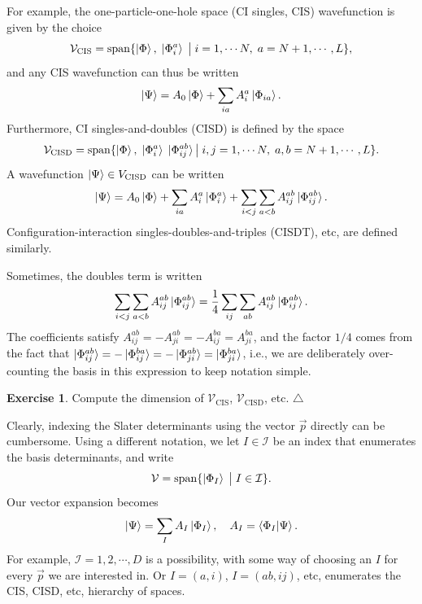 \documentclass{report}
\theoremstyle{plain}
\theoremstyle{definition}
\newtheorem{exerc}{Exercise}[chapter]
\newcommand\xqed[1]{%
  \leavevmode\unskip\penalty9999 \hbox{}\nobreak\hfill
  \quad\hbox{#1}}
\newcommand\demo{\xqed{$\triangle$}}
\newenvironment{exercise}{\bigskip\begin{exerc}}{\demo\end{exerc}\bigskip}
\begin{document}
For example, the one-particle-one-hole space (CI singles, CIS)
wavefunction is given by the choice
\begin{equation}
  \mathcal{V}_\text{CIS} = \operatorname{span} \{ \ket{\Phi}, \; \ket{\Phi_i^a} \; \big| \;
  i = 1,\cdots N, \; a = N+1,\cdots, L \},
\end{equation}
and any CIS wavefunction can thus be written
\begin{equation}
  \ket{\Psi} = A_0 \ket{\Phi} + \sum_{ia} A_{i}^{a} \ket{\Phi_{ia}}.
\end{equation}
Furthermore, CI singles-and-doubles (CISD) is defined by the space
\begin{equation}
  \mathcal{V}_\text{CISD} = \operatorname{span} \{ \ket{\Phi}, \; \ket{\Phi_i^a}
  \; \ket{\Phi_{ij}^{ab}} \big| \;
  i,j = 1,\cdots N, \; a,b = N+1,\cdots, L \}.
\end{equation}
A wavefunction $\ket{\Psi} \in V_\text{CISD}$ can be written
\begin{equation}
  \ket{\Psi} = A_0 \ket{\Phi} + \sum_{ia} A_{i}^{a} \ket{\Phi_{i}^a} +
   \sum_{i<j}\sum_{a<b} A_{ij}^{ab} \ket{\Phi_{ij}^{ab}}.
\end{equation}
Configuration-interaction singles-doubles-and-triples (CISDT), etc,
are defined similarly. 

Sometimes, the doubles term is written
\begin{equation}
  \sum_{i<j}\sum_{a<b} A_{ij}^{ab} \ket{\Phi_{ij}^{ab}} = \frac{1}{4}
  \sum_{ij}\sum_{ab} A_{ij}^{ab} \ket{\Phi_{ij}^{ab}}.
\end{equation}
The coefficients satisfy $A_{ij}^{ab} = -A_{ji}^{ab} = - A_{ij}^{ba} =
A_{ji}^{ba}$, and the factor $1/4$ comes from the fact that
$\ket{\Phi_{ij}^{ab}} = - \ket{\Phi_{ij}^{ba}} = -
\ket{\Phi_{ji}^{ab}} = \ket{\Phi_{ji}^{ba}}$, i.e., we are deliberately
  over-counting the basis in this expression to keep notation simple.

\begin{exercise}
  Compute the dimension of $\mathcal{V}_\text{CIS}$, $\mathcal{V}_{\text{CISD}}$, etc.
\end{exercise}

Clearly, indexing the Slater determinants using the
vector $\vec{p}$ directly can be cumbersome. Using a different notation,
we let $I \in \mathcal{I}$ be an index that enumerates the basis
determinants, and write
\begin{equation}
  \mathcal{V} = \operatorname{span} \{ \ket{\Phi_I} \; \big| \; I \in
  \mathcal{I} \}.
\end{equation}
Our vector
expansion becomes
\begin{equation}
  \ket{\Psi} = \sum_{I} A_{I} \ket{\Phi_I},
  \quad A_{I} = \braket{\Phi_I|\Psi}.
\end{equation}
For example, $\mathcal{I} = 1,2,\cdots,D$ is a possibility, with some
way of choosing an $I$ for every $\vec{p}$ we are interested in. Or $I
= (a,i)$, $I = (ab,ij)$, etc, enumerates the CIS, CISD, etc, hierarchy
of spaces. 
\end{document}
